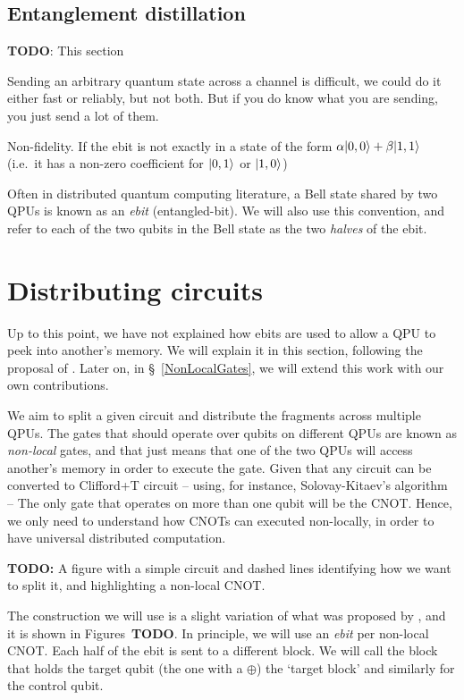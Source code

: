 \subsection{Entanglement distillation}
\label{Distillation}

\textbf{TODO}: This section

Sending an arbitrary quantum state across a channel is difficult, we could do it either fast or reliably, but not both. But if you do know what you are sending, you just send a lot of them.

Non-fidelity. If the ebit is not exactly in a state of the form \(\alpha\vert 0,0 \rangle + \beta\vert 1,1 \rangle\) (i.e.\ it has a non-zero coefficient for \(\vert 0,1 \rangle\) or \(\vert 1,0 \rangle\))

Often in distributed quantum computing literature, a Bell state shared by two QPUs is known as an \textit{ebit} (entangled-bit). We will also use this convention, and refer to each of the two qubits in the Bell state as the two \textit{halves} of the ebit.

\section{Distributing circuits}
\label{IntroDistributing}

Up to this point, we have not explained how ebits are used to allow a QPU to peek into another's memory. We will explain it in this section, following the proposal of \citet{NonLocalCNOT}. Later on, in \S~\ref{NonLocalGates}, we will extend this work with our own contributions. 

We aim to split a given circuit and distribute the fragments across multiple QPUs. The gates that  should operate over qubits on different QPUs are known as \textit{non-local} gates, and that just means that one of the two QPUs will access another's memory in order to execute the gate. Given that any circuit can be converted to Clifford+T circuit -- using, for instance, Solovay-Kitaev's algorithm -- The only gate that operates on more than one qubit will be the CNOT. Hence, we only need to understand how CNOTs can executed non-locally, in order to have universal distributed computation.

\textbf{TODO:} A figure with a simple circuit and dashed lines identifying how we want to split it, and highlighting a non-local CNOT.

The construction we will use is a slight variation of what was proposed by \citet{NonLocalCNOT}, and it is shown in Figures~\textbf{TODO}. In principle, we will use an \textit{ebit} per non-local CNOT. Each half of the ebit is sent to a different block. We will call the block that holds the target qubit (the one with a \(\oplus\)) the `target block' and similarly for the control qubit. 

